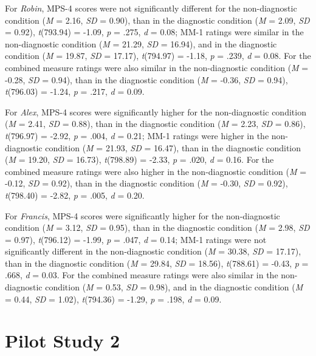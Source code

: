\documentclass[
  american,
  man,floatsintext]{apa7}
\begin{document}
For \emph{Robin}, MPS-4 scores were not significantly different for the non-diagnostic condition (\emph{M} = 2.16, \emph{SD} = 0.90), than in the diagnostic condition (\emph{M} = 2.09, \emph{SD} = 0.92), \emph{t}(793.94) = -1.09, \emph{p} = .275, \emph{d} = 0.08; MM-1 ratings were similar in the non-diagnostic condition (\emph{M} = 21.29, \emph{SD} = 16.94), and in the diagnostic condition (\emph{M} = 19.87, \emph{SD} = 17.17), \emph{t}(794.97) = -1.18, \emph{p} = .239, \emph{d} = 0.08. For the combined measure ratings were also similar in the non-diagnostic condition (\emph{M} = -0.28, \emph{SD} = 0.94), than in the diagnostic condition (\emph{M} = -0.36, \emph{SD} = 0.94), \emph{t}(796.03) = -1.24, \emph{p} = .217, \emph{d} = 0.09.

For \emph{Alex}, MPS-4 scores were significantly higher for the non-diagnostic condition (\emph{M} = 2.41, \emph{SD} = 0.88), than in the diagnostic condition (\emph{M} = 2.23, \emph{SD} = 0.86), \emph{t}(796.97) = -2.92, \emph{p} = .004, \emph{d} = 0.21; MM-1 ratings were higher in the non-diagnostic condition (\emph{M} = 21.93, \emph{SD} = 16.47), than in the diagnostic condition (\emph{M} = 19.20, \emph{SD} = 16.73), \emph{t}(798.89) = -2.33, \emph{p} = .020, \emph{d} = 0.16. For the combined measure ratings were also higher in the non-diagnostic condition (\emph{M} = -0.12, \emph{SD} = 0.92), than in the diagnostic condition (\emph{M} = -0.30, \emph{SD} = 0.92), \emph{t}(798.40) = -2.82, \emph{p} = .005, \emph{d} = 0.20.

For \emph{Francis}, MPS-4 scores were significantly higher for the non-diagnostic condition (\emph{M} = 3.12, \emph{SD} = 0.95), than in the diagnostic condition (\emph{M} = 2.98, \emph{SD} = 0.97), \emph{t}(796.12) = -1.99, \emph{p} = .047, \emph{d} = 0.14; MM-1 ratings were not significantly different in the non-diagnostic condition (\emph{M} = 30.38, \emph{SD} = 17.17), than in the diagnostic condition (\emph{M} = 29.84, \emph{SD} = 18.56), \emph{t}(788.61) = -0.43, \emph{p} = .668, \emph{d} = 0.03. For the combined measure ratings were also similar in the non-diagnostic condition (\emph{M} = 0.53, \emph{SD} = 0.98), and in the diagnostic condition (\emph{M} = 0.44, \emph{SD} = 1.02), \emph{t}(794.36) = -1.29, \emph{p} = .198, \emph{d} = 0.09.

\newpage

\hypertarget{pilot-study-2}{%
\section{Pilot Study 2}\label{pilot-study-2}}
\end{document}

